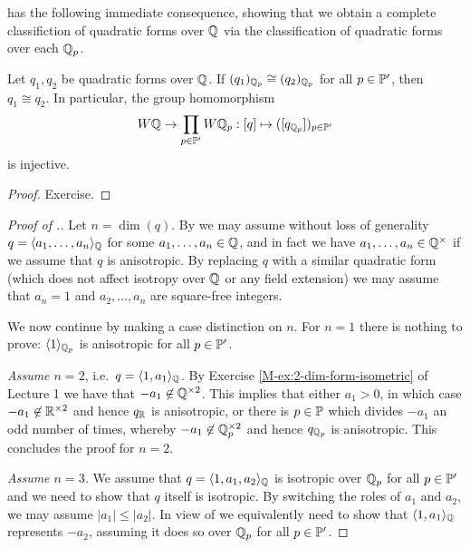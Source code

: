 \documentclass[12pt, leqno, british]{amsart}
\begin{document}
 has the following immediate consequence, showing that we obtain a complete classifiction of quadratic forms over $\mathbb Q$ via the classification of quadratic forms over each $\mathbb Q_p$.
\begin{cor}\label{C:Hasse-Minkowski}
Let $q_1, q_2$ be quadratic forms over $\mathbb Q$.
If $(q_1)_{\mathbb Q_p} \cong (q_2)_{\mathbb Q_p}$ for all $p \in \mathbb P'$, then $q_1 \cong q_2$.
In particular, the group homomorphism
$$ W\mathbb Q \to \prod_{p \in \mathbb P'} W\mathbb Q_p : [q] \mapsto ([q_{\mathbb Q_p}])_{p \in \mathbb P'}$$
is injective.
\end{cor}
\begin{proof}
Exercise.
\end{proof}
\begin{proof}[Proof of .]
Let $n = \dim(q)$.
By  we may assume without loss of generality $q = \langle a_1, \ldots, a_n \rangle_\mathbb Q$ for some $a_1, \ldots, a_n \in \mathbb Q$, and in fact we have $a_1, \ldots, a_n \in \mathbb Q^\times$ if we assume that $q$ is anisotropic.
By replacing $q$ with a similar quadratic form (which does not affect isotropy over $\mathbb Q$ or any field extension) we may assume that $a_n = 1$ and $a_2, \ldots, a_n$ are square-free integers.

We now continue by making a case distinction on $n$.
For $n=1$ there is nothing to prove: $\langle 1 \rangle_{\mathbb Q_p}$ is anisotropic for all $p \in \mathbb P'$.

\emph{Assume $n=2$}, i.e.~$q = \langle 1, a_1 \rangle_\mathbb Q$.
By Exercise \eqref{M-ex:2-dim-form-isometric} of Lecture 1 we have that $-a_1 \not\in \mathbb Q^{\times 2}$.
This implies that either $a_1 > 0$, in which case $-a_1 \not\in \mathbb R^{\times 2}$ and hence $q_\mathbb R$ is anisotropic, or there is $p \in \mathbb P$ which divides $-a_1$ an odd number of times, whereby $-a_1 \not\in \mathbb Q_p^{\times 2}$ and hence $q_{\mathbb Q_p}$ is anisotropic.
This concludes the proof for $n = 2$.

\emph{Assume $n = 3$.}
We assume that $q = \langle 1, a_1, a_2 \rangle_{\mathbb Q}$ is isotropic over $\mathbb Q_p$ for all $p \in \mathbb P'$ and we need to show that $q$ itself is isotropic.
By switching the roles of $a_1$ and $a_2$, we may assume $\lvert a_1 \rvert \leq \lvert a_2 \rvert$.
In view of  we equivalently need to show that $\langle 1, a_1 \rangle_{\mathbb Q}$ represents $-a_2$, assuming it does so over $\mathbb Q_p$ for all $p \in \mathbb P'$.


\end{proof}
\end{document}
